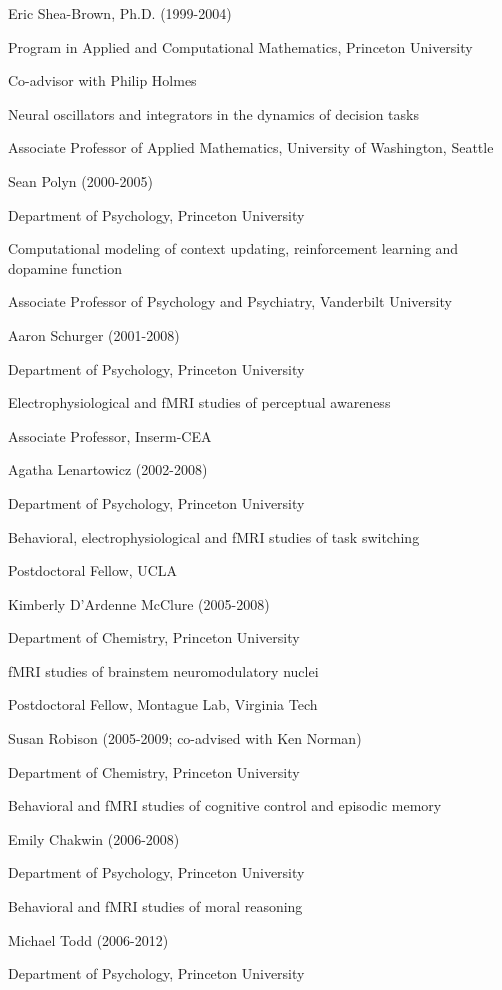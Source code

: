 \documentclass[10 pt]{article}
\begin{document}
Eric Shea-Brown, Ph.D. (1999-2004)

Program in Applied and Computational Mathematics, Princeton University

Co-advisor with Philip Holmes

Neural oscillators and integrators in the dynamics of decision tasks

Associate Professor of Applied Mathematics, University of Washington, Seattle
    \medskip

Sean Polyn (2000-2005)

Department of Psychology, Princeton University

Computational modeling of context updating, reinforcement learning and dopamine function

Associate Professor of Psychology and Psychiatry, Vanderbilt University
    \medskip

Aaron Schurger (2001-2008)

Department of Psychology, Princeton University

Electrophysiological and fMRI studies of perceptual awareness

Associate Professor, Inserm-CEA
    \medskip

Agatha Lenartowicz (2002-2008)

Department of Psychology, Princeton University

Behavioral, electrophysiological and fMRI studies of task switching

Postdoctoral Fellow, UCLA
    \medskip

Kimberly D’Ardenne McClure (2005-2008)

Department of Chemistry, Princeton University

fMRI studies of brainstem neuromodulatory nuclei

Postdoctoral Fellow, Montague Lab, Virginia Tech
    \medskip

Susan Robison (2005-2009; co-advised with Ken Norman)

Department of Chemistry, Princeton University

Behavioral and fMRI studies of cognitive control and episodic memory
    \medskip

Emily Chakwin (2006-2008)

Department of Psychology, Princeton University

Behavioral and fMRI studies of moral reasoning
    \medskip

Michael Todd (2006-2012)

Department of Psychology, Princeton University
\end{document}
